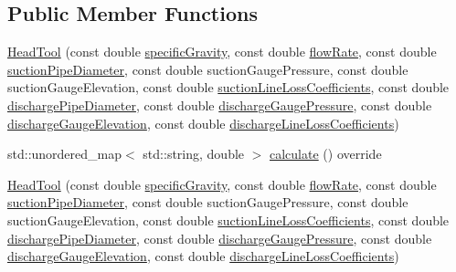 \subsection*{Public Member Functions}
\begin{DoxyCompactItemize}
\item 
\hyperlink{class_head_tool_a9934c87c8f8eb515ff32e46c74004c0e}{Head\+Tool} (const double \hyperlink{class_head_tool_base_ae5af2380fb5db2c25281ef663a5fb65f}{specific\+Gravity}, const double \hyperlink{class_head_tool_base_acf4c03cb62cbf63aba017ce063989fbc}{flow\+Rate}, const double \hyperlink{class_head_tool_base_a357365fc5ef346ce7bcb089c9d1a95e1}{suction\+Pipe\+Diameter}, const double suction\+Gauge\+Pressure, const double suction\+Gauge\+Elevation, const double \hyperlink{class_head_tool_base_ac74c6f6f8ab387efe7b77e0ce6ecd84e}{suction\+Line\+Loss\+Coefficients}, const double \hyperlink{class_head_tool_base_a126a397bd3d87b68864e1962c70bb45e}{discharge\+Pipe\+Diameter}, const double \hyperlink{class_head_tool_base_a39c854f13b16967e02a67cd1aaee07c4}{discharge\+Gauge\+Pressure}, const double \hyperlink{class_head_tool_base_a9ed2160992f8da2e335d919cf9aedd08}{discharge\+Gauge\+Elevation}, const double \hyperlink{class_head_tool_base_a147c035c7422406c594c5fd42ab11eb0}{discharge\+Line\+Loss\+Coefficients})
\item 
std\+::unordered\+\_\+map$<$ std\+::string, double $>$ \hyperlink{class_head_tool_ab107e7717df4ca95404ce1952c21a84e}{calculate} () override
\item 
\hyperlink{class_head_tool_a9934c87c8f8eb515ff32e46c74004c0e}{Head\+Tool} (const double \hyperlink{class_head_tool_base_ae5af2380fb5db2c25281ef663a5fb65f}{specific\+Gravity}, const double \hyperlink{class_head_tool_base_acf4c03cb62cbf63aba017ce063989fbc}{flow\+Rate}, const double \hyperlink{class_head_tool_base_a357365fc5ef346ce7bcb089c9d1a95e1}{suction\+Pipe\+Diameter}, const double suction\+Gauge\+Pressure, const double suction\+Gauge\+Elevation, const double \hyperlink{class_head_tool_base_ac74c6f6f8ab387efe7b77e0ce6ecd84e}{suction\+Line\+Loss\+Coefficients}, const double \hyperlink{class_head_tool_base_a126a397bd3d87b68864e1962c70bb45e}{discharge\+Pipe\+Diameter}, const double \hyperlink{class_head_tool_base_a39c854f13b16967e02a67cd1aaee07c4}{discharge\+Gauge\+Pressure}, const double \hyperlink{class_head_tool_base_a9ed2160992f8da2e335d919cf9aedd08}{discharge\+Gauge\+Elevation}, const double \hyperlink{class_head_tool_base_a147c035c7422406c594c5fd42ab11eb0}{discharge\+Line\+Loss\+Coefficients})
\item 

\end{DoxyCompactItemize}
